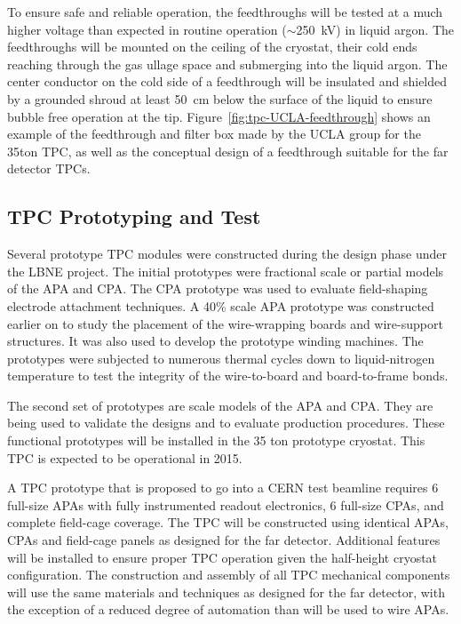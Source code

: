 To ensure safe and reliable operation, the feedthroughs will be tested
at a much higher voltage than expected in routine operation
($\sim$250~kV) in liquid argon. The feedthroughs will be mounted on
the ceiling of the cryostat, their cold ends reaching through the gas
ullage space and submerging into the liquid argon. The center
conductor on the cold side of a feedthrough will be insulated and
shielded by a grounded shroud at least 50~cm below the surface of the
liquid to ensure bubble free operation at the
tip. Figure~\ref{fig:tpc-UCLA-feedthrough} shows an example of the
feedthrough and filter box made by the UCLA group for the 35ton TPC,
as well as the conceptual design of a feedthrough suitable for the far
detector TPCs.


\subsection{TPC Prototyping and Test}
\label{subsec:fd-ref-tpc-proto}


Several prototype TPC modules were constructed during the design phase
under the LBNE project. The initial prototypes were fractional scale
or partial models of the APA and CPA. The CPA prototype was used to
evaluate field-shaping electrode attachment techniques. A 40\% scale
APA prototype was constructed earlier on to study the placement of the
wire-wrapping boards and wire-support structures. It was also used to
develop the prototype winding machines. The prototypes were subjected
to numerous thermal cycles down to liquid-nitrogen temperature to test
the integrity of the wire-to-board and board-to-frame bonds.

The second set of prototypes are scale models of the APA and CPA. They
are being used to validate the designs and to evaluate production
procedures. These functional prototypes will be installed in the 35
ton prototype cryostat. This TPC is expected to be operational in
2015.

A TPC prototype that is proposed to go into a CERN test beamline
requires 6 full-size APAs with fully instrumented readout electronics,
6 full-size CPAs, and complete field-cage coverage. The TPC will be
constructed using identical APAs, CPAs and field-cage panels as
designed for the far detector. Additional features will be installed
to ensure proper TPC operation given the half-height cryostat
configuration. The construction and assembly of all TPC mechanical
components will use the same materials and techniques as designed for
the far detector, with the exception of a reduced degree of automation
than will be used to wire APAs.
